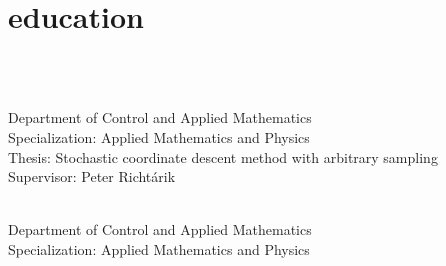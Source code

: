 \documentclass[]{deedy-resume-openfont}
\begin{document}
\begin{minipage}[t]{0.66\textwidth} 

\section{education}
\\
\begin{tightemize}
	\item
{}\\
Department of Control and Applied Mathematics\\
Specialization: Applied Mathematics and Physics\\
Thesis: Stochastic coordinate descent method with arbitrary sampling\\
\normalsize Supervisor: Peter Richt{\'a}rik\\
\vspace{0.1em}
\item
{}\\
Department of Control and Applied Mathematics\\
Specialization: Applied Mathematics and Physics\\
\end{tightemize}
\vspace{0.1em}

\end{minipage}
\end{document}
